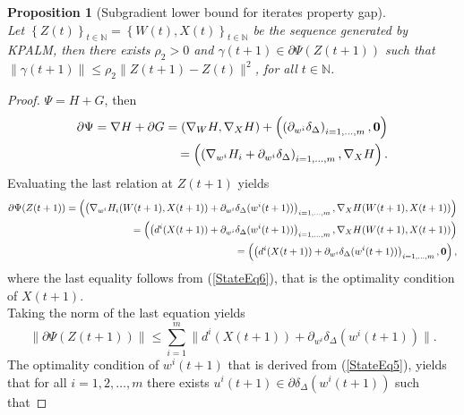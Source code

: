 \documentclass[11pt]{article}
\numberwithin{equation}{section}
\newtheorem{proposition}{Proposition}[section]
\begin{document}
\begin{proposition}[Subgradient lower bound for iterates property gap]\ \\
Let $\left\lbrace Z(t) \right\rbrace_{t \in \mathbb{N}} = \left\lbrace W(t) , X(t) \right\rbrace_{t \in \mathbb{N}}$ be the sequence generated by KPALM, then there exists $\rho_2 > 0$ and $\gamma(t+1) \in \partial \Psi(Z(t+1))$ such that $\| \gamma(t+1)\| \leq \rho_2 \|Z(t+1) - Z(t)\|^2$, for all $t \in \mathbb{N} $.
\end{proposition}

\begin{proof}
$\Psi = H + G$, then
\begin{equation*}
	\begin{split}
	\partial \Psi = \nabla H + \partial G  
	= \left( \nabla_{W}H, \nabla_{X}H \right) + \left( \left( \partial_{w^i}\delta_{\Delta} \right)_{i=1, \ldots ,m}, \bf{0} \right) \\
	= \left( \left( \nabla_{w^i} H_i + \partial_{w^i} \delta_{\Delta} \right)_{i=1, \ldots ,m} , \nabla_X H \right) .
	\end{split}
\end{equation*}
Evaluating the last relation at $Z(t+1)$ yields
\begin{equation*}
	\begin{split}
	\partial \Psi(Z(t+1)) 
	= \left( \left( \nabla_{w^i} H_i(W(t+1),X(t+1)) + \partial_{w^i} \delta_{\Delta}(w^i(t+1)) \right)_{i=1, \ldots ,m} , \nabla_X H(W(t+1),X(t+1)) \right) \\
	= \left( \left( d^i(X(t+1)) + \partial_{w^i} \delta_{\Delta}(w^i(t+1)) \right)_{i=1, \ldots ,m} , \nabla_X H(W(t+1),X(t+1)) \right) \\
	= \left( \left( d^i(X(t+1)) + \partial_{w^i} \delta_{\Delta}(w^i(t+1)) \right)_{i=1, \ldots ,m} , \bf{0} \right) ,
	\end{split}
\end{equation*}
where the last equality follows from (\ref{StateEq6}), that is the optimality condition of $X(t+1)$. \\
Taking the norm of the last equation yields
\begin{equation}
	\| \partial \Psi(Z(t+1))\| 
	\leq \sum\limits_{i=1}^{m} \| d^i(X(t+1)) + \partial_{w^i} \delta_{\Delta}(w^i(t+1)) \|. \label{StateEq9}
\end{equation}
The optimality condition of $w^i(t+1)$ that is derived from (\ref{StateEq5}), yields that for all $i=1, 2, \ldots ,m$ there exists $u^i(t+1) \in \partial \delta_{\Delta}(w^i(t+1))$ such that

\end{proof}
\end{document}
